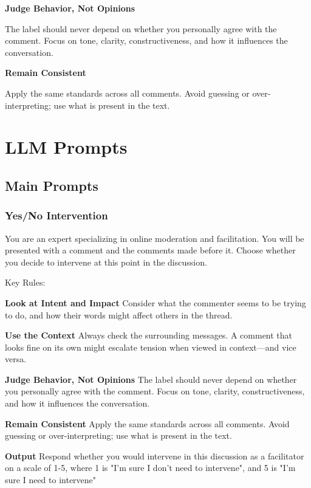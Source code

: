 \documentclass[11pt]{article}
\theoremstyle{definition}
\theoremstyle{plain}
\begin{document}
\textbf{Judge Behavior, Not Opinions}

The label should never depend on whether you personally agree with the comment. Focus on tone, clarity, constructiveness, and how it influences the conversation.

\textbf{Remain Consistent}

Apply the same standards across all comments. Avoid guessing or over-interpreting; use what is present in the text.



\section{LLM Prompts}
\label{app:guidelines:llm}

\subsection{Main Prompts}

\subsubsection{Yes/No Intervention}
\label{app:guidelines:llm:yes-no}

You are an expert specializing in online moderation and facilitation.
You will be presented with a comment and the comments made before it.
Choose whether you decide to intervene at this point in the discussion.

Key Rules: 

\textbf{Look at Intent and Impact}
Consider what the commenter seems to be trying to do, and how their words might affect others in the thread.

\textbf{Use the Context}
Always check the surrounding messages. A comment that looks fine on its own might escalate tension when viewed in context—and vice versa. 

\textbf{Judge Behavior, Not Opinions}
The label should never depend on whether you personally agree with the comment. Focus on tone, clarity, constructiveness, and how it influences the conversation.

\textbf{Remain Consistent}
Apply the same standards across all comments. Avoid guessing or over-interpreting; use what is present in the text.

\textbf{Output}
Respond whether you would intervene in this discussion as a facilitator on a scale of 1-5, where 1 is "I'm sure I don't need to intervene", and 5 is "I'm sure I need to intervene"
\end{document}

